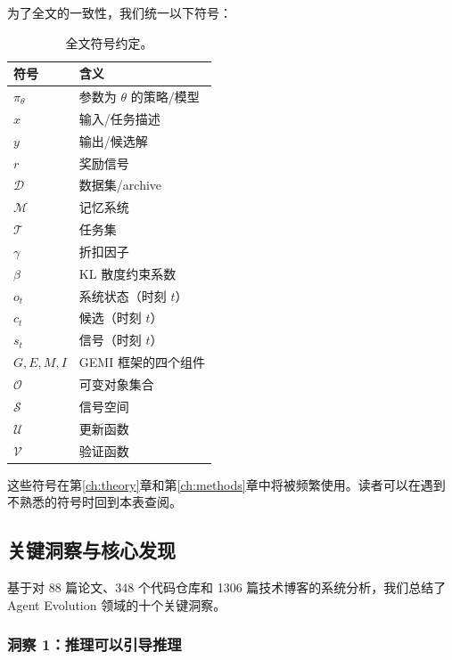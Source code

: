 为了全文的一致性，我们统一以下符号：

\begin{table}[htbp]
\centering
\caption{全文符号约定。}
\label{tab:notation}
\begin{tabular}{ll}
\toprule
\textbf{符号} & \textbf{含义} \\
\midrule
$\pi_\theta$ & 参数为 $\theta$ 的策略/模型 \\
$x$ & 输入/任务描述 \\
$y$ & 输出/候选解 \\
$r$ & 奖励信号 \\
$\mathcal{D}$ & 数据集/archive \\
$\mathcal{M}$ & 记忆系统 \\
$\mathcal{T}$ & 任务集 \\
$\gamma$ & 折扣因子 \\
$\beta$ & KL 散度约束系数 \\
$o_t$ & 系统状态（时刻 $t$） \\
$c_t$ & 候选（时刻 $t$） \\
$s_t$ & 信号（时刻 $t$） \\
$G, E, M, I$ & GEMI 框架的四个组件 \\
$\mathcal{O}$ & 可变对象集合 \\
$\mathcal{S}$ & 信号空间 \\
$\mathcal{U}$ & 更新函数 \\
$\mathcal{V}$ & 验证函数 \\
\bottomrule
\end{tabular}
\end{table}

这些符号在第\ref{ch:theory}章和第\ref{ch:methods}章中将被频繁使用。读者可以在遇到不熟悉的符号时回到本表查阅。

\subsection{关键洞察与核心发现}\label{sec:intro-insights}

基于对 88 篇论文、348 个代码仓库和 1306 篇技术博客的系统分析，我们总结了 Agent Evolution 领域的十个关键洞察。

\subsubsection{洞察 1：推理可以引导推理}

